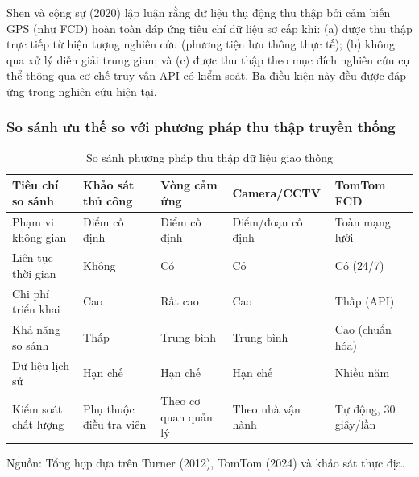 Shen và cộng sự (2020) lập luận rằng dữ liệu thụ động thu thập bởi cảm biến GPS (như FCD) hoàn toàn đáp ứng tiêu chí dữ liệu sơ cấp khi: (a) được thu thập trực tiếp từ hiện tượng nghiên cứu (phương tiện lưu thông thực tế); (b) không qua xử lý diễn giải trung gian; và (c) được thu thập theo mục đích nghiên cứu cụ thể thông qua cơ chế truy vấn API có kiểm soát. Ba điều kiện này đều được đáp ứng trong nghiên cứu hiện tại.

\subsubsection{So sánh ưu thế so với phương pháp thu thập truyền thống}

\begin{table}[H]
\centering
\caption{So sánh phương pháp thu thập dữ liệu giao thông}
\begin{tabular}{|p{3cm}|p{2.5cm}|p{2.5cm}|p{2.5cm}|p{3.5cm}|}
\hline
\textbf{Tiêu chí so sánh} & \textbf{Khảo sát thủ công} & \textbf{Vòng cảm ứng} & \textbf{Camera/CCTV} & \textbf{TomTom FCD} \\
\hline
Phạm vi không gian & Điểm cố định & Điểm cố định & Điểm/đoạn cố định & Toàn mạng lưới \\
\hline
Liên tục thời gian & Không & Có & Có & Có (24/7) \\
\hline
Chi phí triển khai & Cao & Rất cao & Cao & Thấp (API) \\
\hline
Khả năng so sánh & Thấp & Trung bình & Trung bình & Cao (chuẩn hóa) \\
\hline
Dữ liệu lịch sử & Hạn chế & Hạn chế & Hạn chế & Nhiều năm \\
\hline
Kiểm soát chất lượng & Phụ thuộc điều tra viên & Theo cơ quan quản lý & Theo nhà vận hành & Tự động, 30 giây/lần \\
\hline
\end{tabular}
\end{table}

Nguồn: Tổng hợp dựa trên Turner (2012), TomTom (2024) và khảo sát thực địa.

